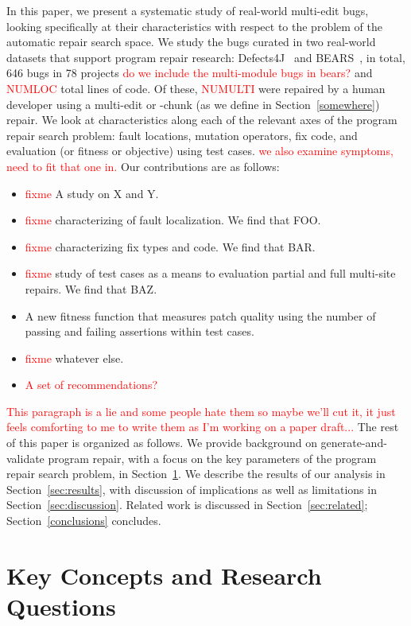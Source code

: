 \documentclass[sigconf, timestamp-false, anonymous=true]{acmart}
\newcommand\todo[1]{\textcolor{red}{#1}}
\begin{document}
In this paper, we present a systematic study of real-world multi-edit bugs,
looking specifically at their characteristics with respect to the problem of the
automatic repair search space.  
We study the bugs curated in two
real-world datasets that support program repair research: Defects4J~\cite{defects4j}
and BEARS~\cite{bears}, in total, 646 bugs in 78 projects \todo{do we include the multi-module bugs 
in bears?} and
\todo{NUMLOC} total lines of code.  Of these, \todo{NUMULTI} were repaired by a
human developer using a multi-edit or -chunk (as we define in
Section~\ref{somewhere}) repair.  We look at characteristics along each of the
relevant axes of the program repair search problem: fault locations, mutation
operators, fix code, and evaluation (or fitness or objective) using test cases.  
\todo{we also examine symptoms, need to fit that one in.}  Our contributions are
as follows:

\begin{itemize}
\item \todo{fixme} A study on X and Y.
\item \todo{fixme} characterizing of fault localization.  We find that FOO.
\item \todo{fixme} characterizing fix types and code.  We find that BAR.
\item \todo{fixme} study of test cases as a means to evaluation partial and full
  multi-site repairs.  We find that BAZ.
\item A new fitness function that measures patch quality using the number of 
	passing and failing assertions within test cases.
\item \todo{fixme} whatever else.
\item \todo{A set of recommendations?}
\end{itemize}

\todo{This paragraph is a lie and some people hate them so maybe we'll cut it,
  it just feels comforting to me to write them as I'm working on a paper draft...}
The rest of this paper is organized as follows.  We provide background on
generate-and-validate program repair, with a focus on the key parameters of the
program repair search problem, in Section~\ref{sec:background}.  We describe the results of our analysis in
Section~\ref{sec:results}, with discussion of implications as well as
limitations in Section~\ref{sec:discussion}.  Related work is discussed in
Section~\ref{sec:related}; Section~\ref{conclusions} concludes.

\section{Key Concepts and Research Questions}
\label{sec:background}
\end{document}
